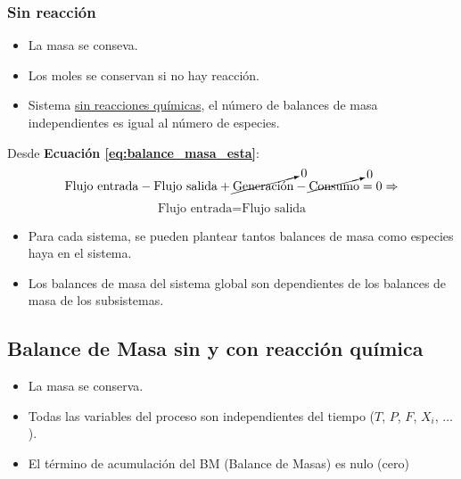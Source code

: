        \subsubsection{Sin reacción}
        
        \begin{itemize}
            \item La masa se conseva.
            \item Los moles se conservan si no hay reacción.
            \item Sistema \underline{sin reacciones químicas}, el número de balances de masa independientes es igual al número de especies.
        \end{itemize}
        
        Desde \textbf{Ecuación \ref{eq:balance_masa_esta}}:
        \[\text{Flujo entrada} - \text{Flujo salida} + \cancelto{0}{\text{Generación}} - \cancelto{0}{\text{Consumo}} = 0 \Rightarrow\]
        \begin{equation}
        \label{eq:balance_masa_esta_sin}
            \text{Flujo entrada} = \text{Flujo salida}
        \end{equation}
        
        
        
        
        \begin{itemize}
            \item Para cada sistema, se pueden plantear tantos balances de masa como especies haya en el sistema.
            \item Los balances de masa del sistema global son dependientes de los balances de masa de los subsistemas.
        \end{itemize}
    
    \subsection{Balance de Masa sin y con reacción química}
    
    \begin{itemize}
        \item La masa se conserva.
        \item Todas las variables del proceso son independientes del tiempo (\(T\), \(P\), \(F\), \(X_{i}\), \(\dots\)).
        \item El término de acumulación del BM (Balance de Masas) es nulo (cero)
    \end{itemize}
    
